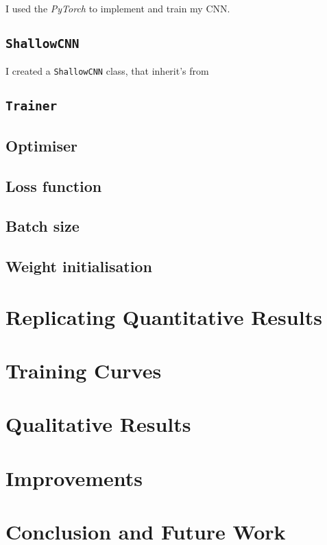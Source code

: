 \documentclass[conference]{IEEEtran}
\begin{document}
I used the \textit{PyTorch} \cite{PyTorch} to implement and train my CNN.

\subsection{\texttt{ShallowCNN}}

I created a \texttt{ShallowCNN} class, that inherit's from 

\subsection{\texttt{Trainer}}

\subsection{Optimiser}

\subsection{Loss function}

\subsection{Batch size}

\subsection{Weight initialisation}

\section{Replicating Quantitative Results}

\section{Training Curves}

\section{Qualitative Results}

\section{Improvements}

\section{Conclusion and Future Work}





\end{document}
